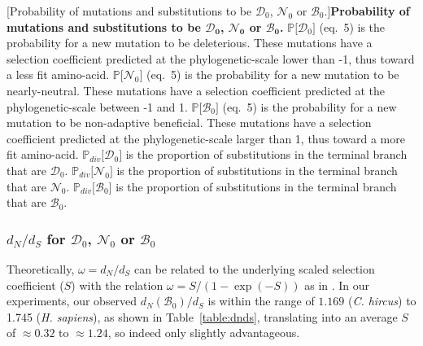 \documentclass{article}
\newcommand{\proba}{\mathbb{P}}
\newcommand{\dn}{d_N}
\newcommand{\ds}{d_S}
\newcommand{\dnds}{\dn / \ds}
\newcommand{\SphyDel}{\mathcal{D}_0}
\newcommand{\SphyNeu}{\mathcal{N}_0}
\newcommand{\SphyBen}{\mathcal{B}_0}
\begin{document}
\begin{center}
    [Probability of mutations and substitutions to be $\SphyDel$, $\SphyNeu$ or $\SphyBen$.]{\textbf{Probability of mutations and substitutions to be $\bm{\SphyDel}$, $\bm{\SphyNeu}$ or $\bm{\SphyBen}$.}
    $\proba{[} \SphyDel {]}$ (eq.~5) is the probability for a new mutation to be deleterious.
     These mutations have a selection coefficient predicted at the phylogenetic-scale lower than -1, thus toward a less fit amino-acid.
    $\proba{[} \SphyNeu {]}$ (eq.~5) is the probability for a new mutation to be nearly-neutral.
    These mutations have a selection coefficient predicted at the phylogenetic-scale between -1 and 1.
    $\proba{[} \SphyBen {]}$ (eq.~5) is the probability for a new mutation to be non-adaptive beneficial.
    These mutations have a selection coefficient predicted at the phylogenetic-scale larger than 1, thus toward a more fit amino-acid.
    $\proba_{div}[\SphyDel{]}$ is the proportion of substitutions in the terminal branch that are $\SphyDel$.
    $\proba_{div}[\SphyNeu{]}$ is the proportion of substitutions in the terminal branch that are $\SphyNeu$.
    $\proba_{div}[\SphyBen{]}$ is the proportion of substitutions in the terminal branch that are $\SphyBen$.\label{table:pdiv}}
    \end{center}
    \newpage

    \subsubsection{\texorpdfstring{$\dnds$}{dₙ/dₛ} for \texorpdfstring{$\SphyDel$}{D₀}, \texorpdfstring{$\SphyNeu$}{N₀} or \texorpdfstring{$\SphyBen$}{B₀}}
    Theoretically, $\omega = \dn / \ds$ can be related to the underlying scaled selection coefficient ($S$) with the relation $\omega = S /(1-\exp(-S))$ as in \cite[eq. 3]{nielsen_estimating_2003}.
    In our experiments, our observed $\dn(\SphyBen) / \ds$ is within the range of $1.169$ (\textit{C. hircus}) to 1.745 (\textit{H. sapiens}), as shown in Table~\ref{table:dnds}, translating into an average $S$ of $\approx0.32$ to $\approx1.24$, so indeed only slightly advantageous.\\
\end{document}
